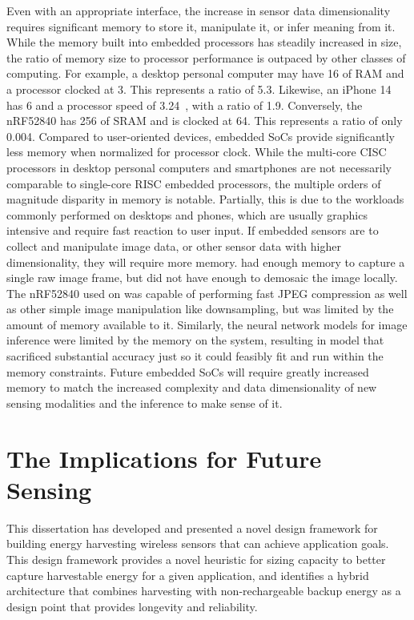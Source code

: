 Even with an appropriate interface, the increase in sensor data dimensionality requires significant memory to store it, manipulate it, or infer meaning from it.
While the memory built into embedded processors has steadily increased in size, the ratio of memory size to processor performance is outpaced by other classes of computing.
For example, a desktop personal computer may have 
16\ssi{\giga\byte} of RAM and a processor clocked at 3\ssi{\giga\hertz}. 
This represents a ratio of 5.3\ssi[per-mode=symbol]{\byte\per\hertz}.
Likewise, an iPhone 14 has 6\ssi{\giga\byte} and a processor speed of 3.24\ssi{\giga\hertz}~\cite{iphone14}, with a ratio of 1.9\ssi[per-mode=symbol]{\byte\per\hertz}.
Conversely, the nRF52840 
has 256\ssi{\kilo\byte} of SRAM and  
is clocked at 64\ssi{\mega\hertz}. This represents a ratio of only \num{0.004}\ssi[per-mode=symbol]{\byte\per\hertz}.
Compared to user-oriented devices, embedded SoCs provide significantly less memory when normalized for processor clock.
While the multi-core CISC processors in desktop personal computers and smartphones are not necessarily comparable to single-core RISC embedded processors, the multiple orders of magnitude disparity in memory is notable.
Partially, this is due to the workloads commonly performed on desktops and phones, which are usually graphics intensive and require fast reaction to user input.
If embedded sensors are to collect and manipulate image data, or other sensor data with higher dimensionality, they will require more memory.
\namec had enough memory to capture a single raw image frame, but did not have enough to demosaic the image locally.
The nRF52840 used on \namec was capable of performing fast JPEG compression as well as other simple image manipulation like downsampling, but was limited by the amount of memory available to it.
Similarly, the neural network models for image inference were limited by the memory on the system, resulting in model that sacrificed substantial accuracy just so it could feasibly fit and run within the memory constraints.
Future embedded SoCs will require greatly increased memory to match the increased complexity and data dimensionality of new sensing modalities and the inference to make sense of it.

\section{The Implications for Future Sensing}
This dissertation has developed and presented a novel design framework for building energy harvesting wireless sensors that can achieve application goals. 
This design framework provides a novel heuristic for sizing capacity to better capture harvestable energy for a given application, and identifies a hybrid architecture that combines harvesting with non-rechargeable backup energy as a design point that provides longevity and reliability.

